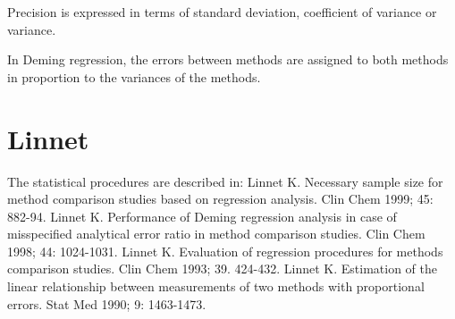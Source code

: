 Precision is expressed in terms of standard deviation, coefficient of variance or variance.

In Deming regression, the errors between methods are assigned to both methods in proportion to the variances of the methods.


\section*{Linnet}
The statistical procedures are described in:
Linnet K. Necessary sample size for method comparison studies based on regression analysis. Clin Chem 1999; 45: 882-94.
Linnet K. Performance of Deming regression analysis in case of misspecified analytical error ratio in method comparison studies. Clin Chem 1998; 44: 1024-1031.
Linnet K. Evaluation of regression procedures for methods comparison studies. Clin Chem 1993; 39. 424-432.
Linnet K. Estimation of the linear relationship between measurements of two methods with proportional errors. Stat Med 1990; 9: 1463-1473.

